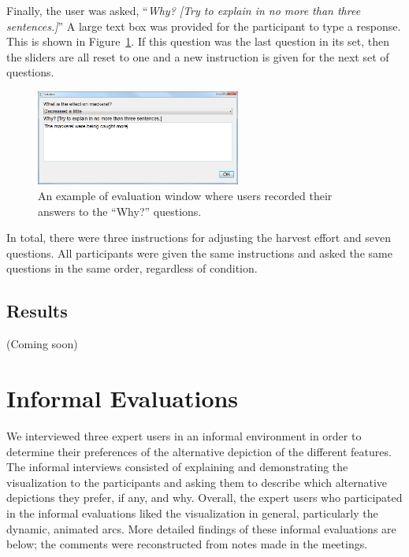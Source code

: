 Finally, the user was asked, ``\textit{Why? [Try to explain in no more than three sentences.]}''  A large text box was provided for the participant to type a response.  This is shown in Figure~\ref{fig:eval_why}. If this question was the last question in its set, then the sliders are all reset to one and a new instruction is given for the next set of questions. 

\begin{figure}[h]
	\centering
	\includegraphics[width=0.6\textwidth]{figures/png/eval_why.png}
	\caption{An example of evaluation window where users recorded their answers to the ``Why?'' questions.}
	\label{fig:eval_why}
\end{figure}

In total, there were three instructions for adjusting the harvest effort and seven questions.  All participants were given the same instructions and asked the same questions in the same order, regardless of condition.

\subsection{Results}

(Coming soon)

\section{Informal Evaluations}

We interviewed three expert users in an informal environment in order to determine their preferences of the alternative depiction of the different features.  The informal interviews consisted of explaining and demonstrating the visualization to the participants and asking them to describe which alternative depictions they prefer, if any, and why.  Overall, the expert users who participated in the informal evaluations liked the visualization in general, particularly the dynamic, animated arcs.  More detailed findings of these informal evaluations are below; the comments were reconstructed from notes made in the meetings.

